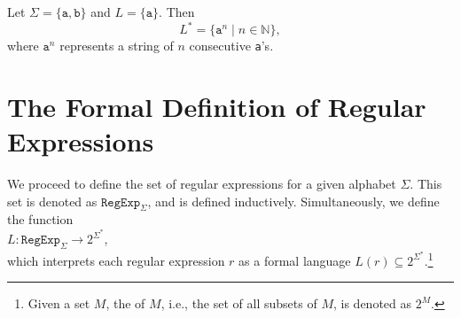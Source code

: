\exampleEng
Let $ \Sigma = \{ \texttt{a}, \texttt{b} \} $ and $ L = \{ \texttt{a} \} $. Then
\[
L^* = \{ \texttt{a}^n \mid n \in \mathbb{N} \},
\]
where $ \texttt{a}^n $ represents a string of $ n $ consecutive \texttt{a}'s. \eox



\section{The Formal Definition of Regular Expressions}
We proceed to define the set of regular expressions for a given alphabet $ \Sigma $. This set is denoted as
$ \texttt{RegExp}_\Sigma $, and is defined inductively. Simultaneously, we define the function 
\\[0.2cm]
\hspace*{1.3cm}
$L: \texttt{RegExp}_\Sigma \rightarrow 2^{\Sigma^*}$,
\\[0.2cm]
which interprets each regular expression $ r $ as a formal language $ L(r) \subseteq 2^{\Sigma^*} $.\footnote{
  Given a set $ M $, the  of $ M $, i.e., the set of all subsets of $ M $, is denoted as $ 2^M $.
}
\pagebreak

